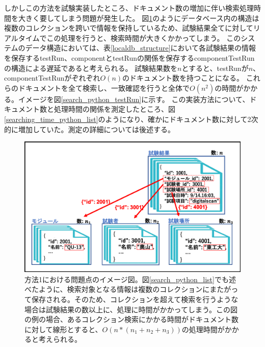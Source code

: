 しかしこの方法を試験実装したところ、ドキュメント数の増加に伴い検索処理時間を大きく要してしまう問題が発生した。
図\ref{search_python_list_problem}のようにデータベース内の構造は複数のコレクションを跨いで情報を保持しているため、試験結果全てに対してリアルタイムでこの処理を行うと、検索時間が大きくかかってしまう。
このシステムのデータ構造においては、表\ref{localdb_structure}において各試験結果の情報を保存するtestRun、componentとtestRunの関係を保存するcomponentTestRunの構造による遅延であると考えられる。
試験結果数を$n$とすると、testRunが$n$、componentTestRunがぞれぞれ$O(n)$のドキュメント数を持つことになる。
これらのドキュメントを全て検索し、一致確認を行うと全体で$O(n^2)$の時間がかかる。イメージを図\ref{search_python_testRun}に示す。
この実装方法について、ドキュメント数と処理時間の関係を測定したところ、図\ref{searching_time_python_list}のようになり、確かにドキュメント数に対して2次的に増加していた。測定の詳細については後述する。
\begin{figure}[bpt]
  \begin{center}
    \includegraphics[width=12cm]{./search_python_list_problem.png}
  \caption[方法1における問題点のイメージ]
{方法1における問題点のイメージ図。図\ref{search_python_list}でも述べたように、検索対象となる情報は複数のコレクションにまたがって保存される。そのため、コレクションを超えて検索を行うような場合は試験結果の数以上に、処理に時間がかかってしまう。この図の例の場合、あるコレクション検索にかかる時間がドキュメント数に対して線形とすると、$O(n*(n_1+n_2+n_3))$の処理時間がかかると考えられる。}
  \label{search_python_list_problem}
  \end{center}
\end{figure}


